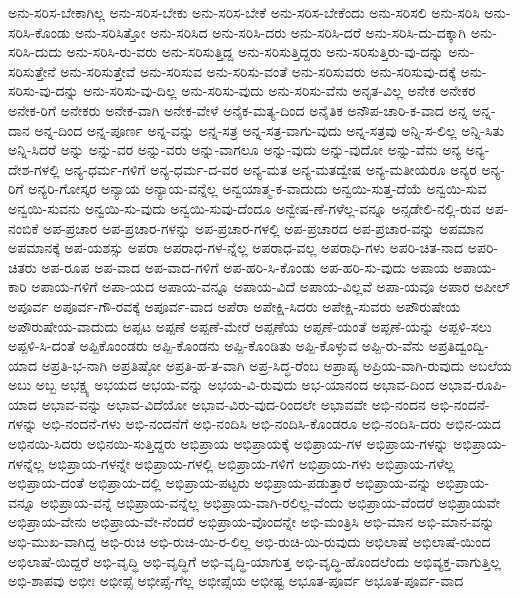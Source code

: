 {ಅನು-ಸರಿಸ-ಬೇಕಾಗಿಲ್ಲ
ಅನು-ಸರಿಸ-ಬೇಕು
ಅನು-ಸರಿಸ-ಬೇಕೆ
ಅನು-ಸರಿಸ-ಬೇಕೆಂದು
ಅನು-ಸರಿಸಲಿ
ಅನು-ಸರಿಸಿ
ಅನು-ಸರಿಸಿ-ಕೊಂಡು
ಅನು-ಸರಿಸಿತ್ತೋ
ಅನು-ಸರಿಸಿದ
ಅನು-ಸರಿಸಿ-ದರು
ಅನು-ಸರಿಸಿ-ದರೆ
ಅನು-ಸರಿಸಿ-ದು-ದಕ್ಕಾಗಿ
ಅನು-ಸರಿಸಿ-ದುದು
ಅನು-ಸರಿಸಿ-ರು-ವರು
ಅನು-ಸರಿಸುತ್ತಿದ್ದ
ಅನು-ಸರಿಸುತ್ತಿದ್ದರು
ಅನು-ಸರಿಸುತ್ತಿರು-ವು-ದನ್ನು
ಅನು-ಸರಿಸುತ್ತೇನೆ
ಅನು-ಸರಿಸುತ್ತೇವೆ
ಅನು-ಸರಿಸುವ
ಅನು-ಸರಿಸು-ವಂತೆ
ಅನು-ಸರಿಸುವರು
ಅನು-ಸರಿಸುವು-ದಕ್ಕೆ
ಅನು-ಸರಿಸು-ವು-ದನ್ನು
ಅನು-ಸರಿಸು-ವು-ದಿಲ್ಲ
ಅನು-ಸರಿಸು-ವುದು
ಅನು-ಸರಿಸು-ವೆನು
ಅನೃತ-ವಿಲ್ಲ
ಅನೇಕ
ಅನೇಕರ
ಅನೇಕ-ರಿಗೆ
ಅನೇಕರು
ಅನೇಕ-ವಾಗಿ
ಅನೇಕ-ವೇಳೆ
ಅನೈಕ-ಮತ್ಯ-ದಿಂದ
ಅನೈತಿಕ
ಅನೌಪ-ಚಾರಿ-ಕ-ವಾದ
ಅನ್ನ
ಅನ್ನ-ದಾನ
ಅನ್ನ-ದಿಂದ
ಅನ್ನ-ಪೂರ್ಣ
ಅನ್ನ-ವನ್ನು
ಅನ್ನ-ಸತ್ರ
ಅನ್ನ-ಸತ್ರ-ವಾಗು-ವುದು
ಅನ್ನ-ಸತ್ರವು
ಅನ್ನಿ-ಸ-ಲಿಲ್ಲ
ಅನ್ನಿ-ಸಿತು
ಅನ್ನಿ-ಸಿದರೆ
ಅನ್ನು
ಅನ್ನು-ವರ
ಅನ್ನು-ವರು
ಅನ್ನು-ವಾಗಲೂ
ಅನ್ನು-ವುದು
ಅನ್ನು-ವುದೋ
ಅನ್ನು-ವೆನು
ಅನ್ಯ
ಅನ್ಯ-ದೇಶ-ಗಳಲ್ಲಿ
ಅನ್ಯ-ಧರ್ಮ-ಗಳಿಗೆ
ಅನ್ಯ-ಧರ್ಮ-ದ-ವರ
ಅನ್ಯ-ಮತ
ಅನ್ಯ-ಮತದ್ವೇಷ
ಅನ್ಯ-ಮತೀಯರೂ
ಅನ್ಯರ
ಅನ್ಯ-ರಿಗೆ
ಅನ್ಯರಿ-ಗೋಸ್ಕರ
ಅನ್ಯಾಯ
ಅನ್ಯಾಯ-ವನ್ನೆಲ್ಲ
ಅನ್ವಯಾತ್ಮ-ಕ-ವಾದುದು
ಅನ್ವಯಿ-ಸುತ್ತ-ದೆಯೆ
ಅನ್ವಯಿ-ಸುವ
ಅನ್ವಯಿ-ಸುವನು
ಅನ್ವಯಿ-ಸು-ವುದು
ಅನ್ವಯಿ-ಸುವು-ದೆಂದೂ
ಅನ್ವೇಷ-ಣೆ-ಗಳೆಲ್ಲ-ವನ್ನೂ
ಅನ್ಸಡೇಲಿ-ನಲ್ಲಿ-ರುವ
ಅಪ-ನಂಬಿಕೆ
ಅಪ-ಪ್ರಚಾರ
ಅಪ-ಪ್ರಚಾರ-ಗಳನ್ನು
ಅಪ-ಪ್ರಚಾರ-ಗಳಲ್ಲಿ
ಅಪ-ಪ್ರಚಾರದ
ಅಪ-ಪ್ರಚಾರ-ವನ್ನು
ಅಪಮಾನ
ಅಪಮಾನಕ್ಕೆ
ಅಪ-ಯಶಸ್ಸು
ಅಪರಾ
ಅಪರಾಧ-ಗಳ-ನ್ನೆಲ್ಲ
ಅಪರಾಧ-ವಲ್ಲ
ಅಪರಾಧಿ-ಗಳು
ಅಪರಿ-ಚಿತ-ನಾದ
ಅಪರಿ-ಚಿತರು
ಅಪ-ರೂಪ
ಅಪ-ವಾದ
ಅಪ-ವಾದ-ಗಳಿಗೆ
ಅಪ-ಹರಿ-ಸಿ-ಕೊಂಡು
ಅಪ-ಹರಿ-ಸು-ವುದು
ಅಪಾಯ
ಅಪಾಯ-ಕಾರಿ
ಅಪಾಯ-ಗಳಿಗೆ
ಅಪಾ-ಯದ
ಅಪಾಯ-ವನ್ನೂ
ಅಪಾಯ-ವಿದೆ
ಅಪಾಯ-ವಿಲ್ಲವೆ
ಅಪಾ-ಯವೂ
ಅಪಾರ
ಅಪೀಲ್
ಅಪೂರ್ವ
ಅಪೂರ್ವ-ಗೌ-ರವಕ್ಕೆ
ಅಪೂರ್ವ-ವಾದ
ಅಪೆರಾ
ಅಪೇಕ್ಷಿ-ಸಿದರು
ಅಪೇಕ್ಷಿ-ಸುವರು
ಅಪೌರುಷೇಯ
ಅಪೌರುಷೇಯ-ವಾದುದು
ಅಪ್ಪಟ
ಅಪ್ಪಣೆ
ಅಪ್ಪಣೆ-ಮೇರೆ
ಅಪ್ಪಣೆಯ
ಅಪ್ಪಣೆ-ಯಂತೆ
ಅಪ್ಪಣೆ-ಯನ್ನು
ಅಪ್ಪಳಿ-ಸಲು
ಅಪ್ಪಳಿ-ಸಿ-ದಂತೆ
ಅಪ್ಪಿಕೊಂಂಡರು
ಅಪ್ಪಿ-ಕೊಂಡನು
ಅಪ್ಪಿ-ಕೊಂಡಿತು
ಅಪ್ಪಿ-ಕೊಳ್ಳುವ
ಅಪ್ಪಿ-ರು-ವೆನು
ಅಪ್ರತಿದ್ವಂದ್ವಿ-ಯಾದ
ಅಪ್ರತಿ-ಭ-ನಾಗಿ
ಅಪ್ರತಿಷ್ಠೋ
ಅಪ್ರತಿ-ಹ-ತ-ವಾಗಿ
ಅಪ್ರ-ಸಿದ್ಧ-ರೆಂಬ
ಅಪ್ರಾಪ್ಯ
ಅಪ್ರಿಯ-ವಾಗಿ-ರುವುದು
ಅಬಲೆಯ
ಅಬು
ಅಬ್ಬ
ಅಭಕ್ಷ್ಯ
ಅಭಯದ
ಅಭಯ-ವನ್ನು
ಅಭಯ-ವಿ-ರುವುದು
ಅಭ-ಯಾನಂದ
ಅಭಾವ-ದಿಂದ
ಅಭಾವ-ರೂಪಿ-ಯಾದ
ಅಭಾವ-ವನ್ನು
ಅಭಾವ-ವಿದೆಯೋ
ಅಭಾವ-ವಿರು-ವುದ-ರಿಂದಲೇ
ಅಭಾವವೇ
ಅಭಿ-ನಂದನ
ಅಭಿ-ನಂದನೆ-ಗಳನ್ನು
ಅಭಿ-ನಂದನೆ-ಗಳು
ಅಭಿ-ನಂದನೆಗೆ
ಅಭಿ-ನಂದಿಸಿ
ಅಭಿ-ನಂದಿಸಿ-ಕೊಂಡರೂ
ಅಭಿ-ನಂದಿಸಿ-ದರು
ಅಭಿನ-ಯದ
ಅಭಿನಯಿ-ಸಿದರು
ಅಭಿನಯಿ-ಸುತ್ತಿದ್ದರು
ಅಭಿಪ್ರಾಯ
ಅಭಿಪ್ರಾಯಕ್ಕೆ
ಅಭಿಪ್ರಾಯ-ಗಳ
ಅಭಿಪ್ರಾಯ-ಗಳನ್ನು
ಅಭಿಪ್ರಾಯ-ಗಳನ್ನೆಲ್ಲ
ಅಭಿಪ್ರಾಯ-ಗಳನ್ನೇ
ಅಭಿಪ್ರಾಯ-ಗಳಲ್ಲಿ
ಅಭಿಪ್ರಾಯ-ಗಳಿಗೆ
ಅಭಿಪ್ರಾಯ-ಗಳು
ಅಭಿಪ್ರಾಯ-ಗಳೆಲ್ಲ
ಅಭಿಪ್ರಾಯ-ದಂತೆ
ಅಭಿಪ್ರಾಯ-ದಲ್ಲಿ
ಅಭಿಪ್ರಾಯ-ಪಟ್ಟರು
ಅಭಿಪ್ರಾಯ-ಪಡುತ್ತಾರೆ
ಅಭಿಪ್ರಾಯ-ವನ್ನು
ಅಭಿಪ್ರಾಯ-ವನ್ನೂ
ಅಭಿಪ್ರಾಯ-ವನ್ನೆ
ಅಭಿಪ್ರಾಯ-ವನ್ನೆಲ್ಲ
ಅಭಿಪ್ರಾಯ-ವಾಗಿ-ರಲಿಲ್ಲ-ವೆಂದು
ಅಭಿಪ್ರಾಯ-ವೆಂದರೆ
ಅಭಿಪ್ರಾಯವೇ
ಅಭಿಪ್ರಾಯ-ವೇನು
ಅಭಿಪ್ರಾಯ-ವೇ-ನೆಂದರೆ
ಅಭಿಪ್ರಾಯ-ವೊಂದನ್ನೇ
ಅಭಿ-ಮಂತ್ರಿಸಿ
ಅಭಿ-ಮಾನ
ಅಭಿ-ಮಾನ-ವನ್ನು
ಅಭಿ-ಮುಖ-ವಾಗಿದ್ದ
ಅಭಿ-ರುಚಿ
ಅಭಿ-ರುಚಿ-ಯಿ-ರ-ಲಿಲ್ಲ
ಅಭಿ-ರುಚಿ-ಯಿ-ರುವುದು
ಅಭಿಲಾಷೆ
ಅಭಿಲಾಷೆ-ಯಿಂದ
ಅಭಿಲಾಷೆ-ಯಿದ್ದರೆ
ಅಭಿ-ವೃದ್ಧಿ
ಅಭಿ-ವೃದ್ಧಿಗೆ
ಅಭಿ-ವೃದ್ಧಿ-ಯಾಗುತ್ತ
ಅಭಿ-ವೃದ್ಧಿ-ಹೊಂದಲೆಂದು
ಅಭಿವ್ಯಕ್ತ-ವಾಗುತ್ತಿಲ್ಲ
ಅಭಿ-ಶಾಪವು
ಅಭೀಃ
ಅಭೀಪ್ಸೆ
ಅಭೀಪ್ಸೆ-ಗೆಲ್ಲ
ಅಭೀಪ್ಸೆಯ
ಅಭೀಷ್ಟ
ಅಭೂತ-ಪೂರ್ವ
ಅಭೂತ-ಪೂರ್ವ-ವಾದ
}
